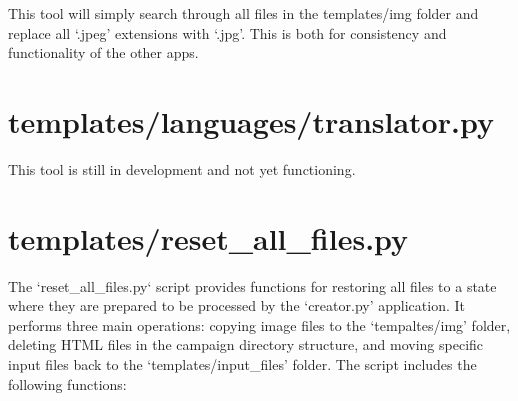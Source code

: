 This tool will simply search through all files in the templates/img folder and replace all `.jpeg' extensions with `.jpg'. This is both for consistency and  functionality of the other apps.



















\section{templates/languages/translator.py}

This tool is still in development and not yet functioning.



















\section{templates/reset\_all\_files.py}

The `reset\_all\_files.py` script provides functions for restoring all files to a state where they are prepared to be processed by the `creator.py' application. It performs three main operations: copying image files to the `tempaltes/img' folder, deleting HTML files in the campaign directory structure, and moving specific input files back to the `templates/input_files' folder. The script includes the following functions:

